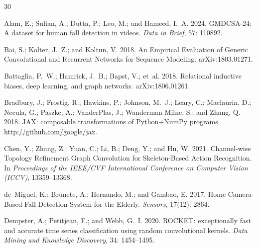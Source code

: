 \begin{thebibliography}{30}
\providecommand{\natexlab}[1]{#1}

Alam, E.; Sufian, A.; Dutta, P.; Leo, M.; and Hameed, I.~A. 2024.
\newblock GMDCSA-24: A dataset for human fall detection in videos.
\newblock \emph{Data in Brief}, 57: 110892.

Bai, S.; Kolter, J.~Z.; and Koltun, V. 2018.
\newblock An Empirical Evaluation of Generic Convolutional and Recurrent Networks for Sequence Modeling.
\newblock arXiv:1803.01271.

Battaglia, P.~W.; Hamrick, J.~B.; Bapst, V.; et~al. 2018.
\newblock Relational inductive biases, deep learning, and graph networks.
\newblock arXiv:1806.01261.

Bradbury, J.; Frostig, R.; Hawkins, P.; Johnson, M.~J.; Leary, C.; Maclaurin, D.; Necula, G.; Paszke, A.; VanderPlas, J.; Wanderman-Milne, S.; and Zhang, Q. 2018.
\newblock JAX: composable transformations of Python+NumPy programs.
\newblock \url{http://github.com/google/jax}.

Chen, Y.; Zhang, Z.; Yuan, C.; Li, B.; Deng, Y.; and Hu, W. 2021.
\newblock Channel-wise Topology Refinement Graph Convolution for Skeleton-Based Action Recognition.
\newblock In \emph{Proceedings of the IEEE/CVF International Conference on Computer Vision (ICCV)}, 13359--13368.

de~Miguel, K.; Brunete, A.; Hernando, M.; and Gambao, E. 2017.
\newblock Home Camera-Based Fall Detection System for the Elderly.
\newblock \emph{Sensors}, 17(12): 2864.

Dempster, A.; Petitjean, F.; and Webb, G.~I. 2020.
\newblock ROCKET: exceptionally fast and accurate time series classification using random convolutional kernels.
\newblock \emph{Data Mining and Knowledge Discovery}, 34: 1454--1495.


\end{thebibliography}
